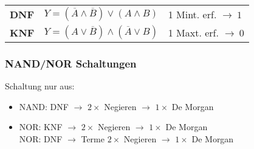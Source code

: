 \begin{flushleft}
    \renewcommand{\arraystretch}{1.5}
    \begin{tabular}{l l l}
        \textbf{DNF} & $Y = (\overline{A} \land \overline{B}) \lor (A \land B)$ & {\small 1 Mint. erf. $\rightarrow~1$}\\
        \textbf{KNF} & $Y = (A \lor \overline{B}) \land (\overline{A} \lor B)$ & {\small 1 Maxt. erf. $\rightarrow~0$}\\
    \end{tabular}
\end{flushleft}
\subsubsection{NAND/NOR Schaltungen}
Schaltung nur aus:
\begin{itemize}
    \item NAND: DNF $\rightarrow$ $2 \times$  Negieren $\rightarrow$ $1 \times$ De Morgan
    \item NOR: KNF $\rightarrow$ $2 \times$ Negieren $\rightarrow$ $1 \times$ De Morgan\\
    NOR: DNF $\rightarrow$ Terme $2 \times$ Negieren $\rightarrow$ $1 \times$ De Morgan
\end{itemize}
